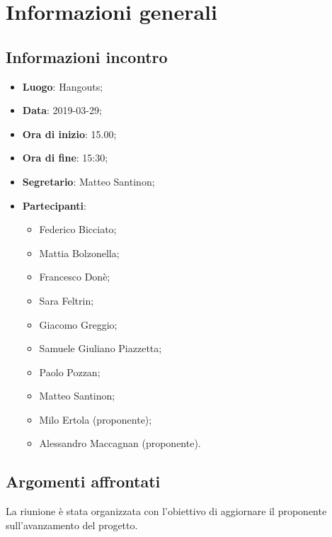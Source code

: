 \section{Informazioni generali}

\subsection{Informazioni incontro}
\begin{itemize}
\item \textbf{Luogo}: Hangouts;
\item \textbf{Data}: 2019-03-29;
\item \textbf{Ora di inizio}: 15.00;
\item \textbf{Ora di fine}: 15:30;
\item \textbf{Segretario}: Matteo Santinon;
\item \textbf{Partecipanti}: 
\begin{itemize}
	\item Federico Bicciato;
	\item Mattia Bolzonella;
	\item Francesco Donè;
	\item Sara Feltrin;
	\item Giacomo Greggio;
	\item Samuele Giuliano Piazzetta;
	\item Paolo Pozzan;
	\item Matteo Santinon;
	\item Milo Ertola (proponente);
	\item Alessandro Maccagnan (proponente).
\end{itemize}
\end{itemize}

\subsection{Argomenti affrontati}
La riunione è stata organizzata con l'obiettivo di aggiornare il proponente 
sull'avanzamento del progetto.

